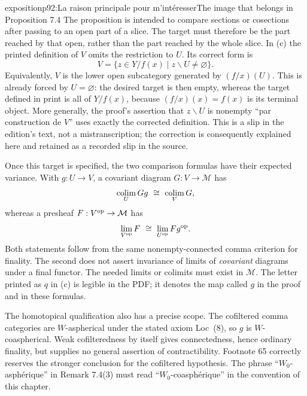 \begin{dcomment}{exposition}{p92:La raison principale pour m'intéresser}{The image that belongs in Proposition 7.4}
The proposition is intended to compare sections or cosections after passing to an open part of a slice. The target must therefore be the part reached by that open, rather than the part reached by the whole slice. In (c) the printed definition of $V$ omits the restriction to $U$. Its correct form is
\[
 V=\{z\in Y/f(x)\mid z\backslash U\ne\varnothing\}.
\]
Equivalently, $V$ is the lower open subcategory generated by $(f/x)(U)$. This is already forced by $U=\varnothing$: the desired target is then empty, whereas the target defined in print is all of $Y/f(x)$, because $(f/x)(x)=f(x)$ is its terminal object. More generally, the proof's assertion that $z\backslash U$ is nonempty ``par construction de $V$'' uses exactly the corrected definition. This is a slip in the edition's text, not a mistranscription; the correction is consequently explained here and retained as a recorded slip in the source.

Once this target is specified, the two comparison formulas have their expected variance. With $g:U\to V$, a covariant diagram $G:V\to\mathcal M$ has
\[
\mathop{\rm colim}_{U}Gg\ \cong\ \mathop{\rm colim}_{V}G,
\]
whereas a presheaf $F:V^{\rm op}\to\mathcal M$ has
\[
\mathop{\rm lim}_{V^{\rm op}}F\ \cong\
\mathop{\rm lim}_{U^{\rm op}}Fg^{\rm op}.
\]
Both statements follow from the same nonempty-connected comma criterion for finality. The second does not assert invariance of limits of \emph{covariant} diagrams under a final functor. The needed limits or colimits must exist in $\mathcal M$. The letter printed as $q$ in (c) is legible in the PDF; it denotes the map called $g$ in the proof and in these formulas.

The homotopical qualification also has a precise scope. The cofiltered comma categories are $W$-aspherical under the stated axiom Loc~(8), so $g$ is $W$-coaspherical. Weak cofilteredness by itself gives connectedness, hence ordinary finality, but supplies no general assertion of contractibility. Footnote 65 correctly reserves the stronger conclusion for the cofiltered hypothesis. The phrase ``$W_0$-asph\'erique'' in Remark 7.4(3) must read ``$W_0$-coasph\'erique'' in the convention of this chapter.
\end{dcomment}

